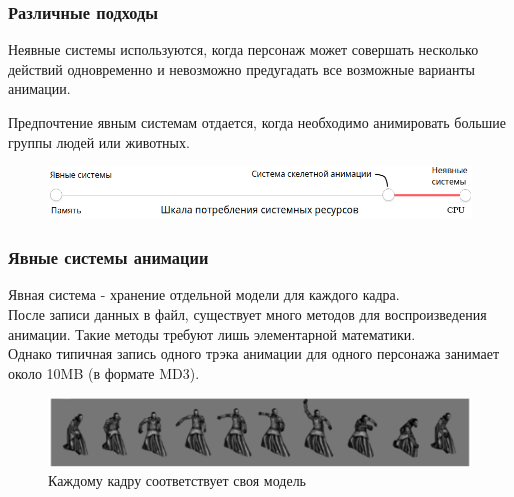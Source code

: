\documentclass{beamer}
\begin{document}
\begin{frame}
\frametitle{Различные подходы}
\begin{small}
    \alert{Неявные системы} используются, когда персонаж может совершать несколько действий одновременно и невозможно предугадать все возможные варианты анимации.
    
    \smallskip
    Предпочтение \alert{явным системам} отдается, когда необходимо анимировать большие группы людей или животных.
    
\begin{figure}[h!]
    \centering
    \includegraphics[width=1\textwidth]{raw_graph_cpu_vs_ram.png}
\end{figure}

\end{small}
\end{frame}



\begin{frame}
\frametitle{Явные системы анимации}
\begin{scriptsize}
    Явная система - хранение отдельной модели для каждого кадра. \\
    После записи данных в файл, существует много методов для воспроизведения анимации.
    Такие методы требуют лишь элементарной математики. \\
    Однако типичная запись одного трэка анимации для одного персонажа занимает около 10MB (в формате MD3).
   
\begin{figure}[h!]
    \centering
    \includegraphics[width=1\textwidth]{explicit_animation.png}
    \caption{Каждому кадру соответствует своя модель}
\end{figure}

\end{scriptsize}
\end{frame}
\end{document}
